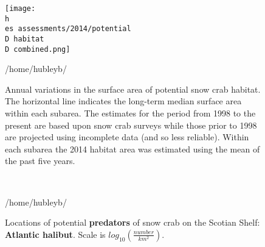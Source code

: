 \documentclass[11pt]{article}
\newcommand{\D}{.}
\newcommand{\h}{/home/hubleyb/}
\newcommand{\es}{bio.data/bio.snowcrab/}
\begin{document}
\begin{figure}
\centering
\texttt{[image: \\h \\es assessments/2014/potential\\D habitat\\D combined.png]}
\caption{Annual variations in the surface area of potential snow crab habitat. The horizontal line indicates the long-term median surface area within each subarea. The estimates for the period from 1998 to the present are based upon snow crab surveys while those prior to 1998 are projected using incomplete data (and so less reliable). Within each subarea the 2014 habitat area was estimated using the mean of the past five years.}
\h \end{figure}
\clearpage

\begin{figure}
\centering
{}\ 
\ 
\\ 

\caption{Locations of potential \textbf{predators} of snow crab on the Scotian Shelf: \textbf{Atlantic halibut}. Scale is $log_{10} \left(\tfrac{number}{km^2}\right)$.}
\h \end{figure}
\end{document}
